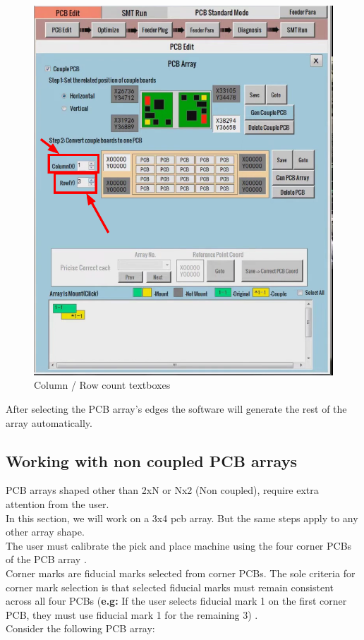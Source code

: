 \documentclass[a4paper,10pt]{report}
\begin{document}
\begin{figure}[!htb]
 \centering
 \includegraphics[width=1\textwidth]{images/scrot10.png}
 \caption{Column / Row count textboxes}
\end{figure}
After selecting the PCB array's edges the software will generate the rest of the array automatically.
\newpage
\subsection{Working with non coupled PCB arrays}
PCB arrays shaped other than 2xN or Nx2 (Non coupled), require extra attention from the user.\\

In this section, we will work on a 3x4 pcb array. But the same steps apply to any other array shape.\\
The user must calibrate the pick and place machine using the four corner PCBs of the PCB array .\\ Corner marks are fiducial marks selected from
corner PCBs.
The sole criteria for corner mark selection is that selected fiducial marks must remain consistent across all four PCBs (\textbf{e.g:} If the user selects fiducial mark 1 on the first corner PCB, they must use fiducial mark 1 for the remaining 3) .\\
Consider the following PCB array:
\end{document}
